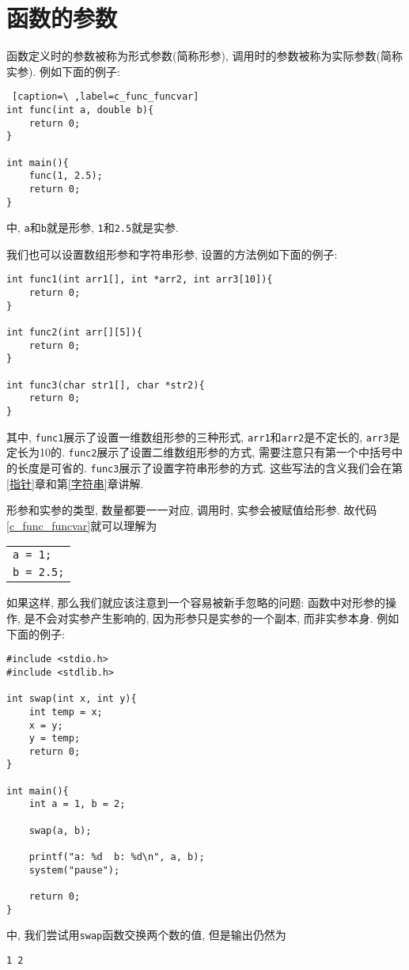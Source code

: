     \section{函数的参数} \label{函数的参数}
        函数定义时的参数被称为形式参数(简称形参), 调用时的参数被称为实际参数(简称实参). 例如下面的例子:
\begin{lstlisting} [caption=\ ,label=c_func_funcvar]
int func(int a, double b){
    return 0;
}

int main(){
    func(1, 2.5);
    return 0;
}
\end{lstlisting}
        中, \texttt{a}和\texttt{b}就是形参, \texttt{1}和\texttt{2.5}就是实参.

        我们也可以设置数组形参和字符串形参, 设置的方法例如下面的例子:
\begin{lstlisting}
int func1(int arr1[], int *arr2, int arr3[10]){
    return 0;
}

int func2(int arr[][5]){
    return 0;
}

int func3(char str1[], char *str2){
    return 0;
}
\end{lstlisting}

        其中, \texttt{func1}展示了设置一维数组形参的三种形式, \texttt{arr1}和\texttt{arr2}是不定长的, \texttt{arr3}是定长为10的. \texttt{func2}展示了设置二维数组形参的方式, 需要注意只有第一个中括号中的长度是可省的. \texttt{func3}展示了设置字符串形参的方式. 这些写法的含义我们会在第\ref{指针}章和第\ref{字符串}章讲解.

        形参和实参的类型, 数量都要一一对应, 调用时, 实参会被赋值给形参. 故代码\ref{c_func_funcvar}就可以理解为
        \begin{center}
        \begin{longtable}{l}
            \texttt{a = 1;} \\
            \texttt{b = 2.5;}
        \end{longtable}
        \end{center}

        如果这样, 那么我们就应该注意到一个容易被新手忽略的问题: 函数中对形参的操作, 是不会对实参产生影响的, 因为形参只是实参的一个副本, 而非实参本身. 例如下面的例子:
\begin{lstlisting}
#include <stdio.h>
#include <stdlib.h>

int swap(int x, int y){
    int temp = x;
    x = y;
    y = temp;
    return 0;
}

int main(){
    int a = 1, b = 2;

    swap(a, b);
    
    printf("a: %d  b: %d\n", a, b);
    system("pause");

    return 0;
}
\end{lstlisting}
        中, 我们尝试用\texttt{swap}函数交换两个数的值, 但是输出仍然为
\begin{lstlisting}
1 2
\end{lstlisting}

